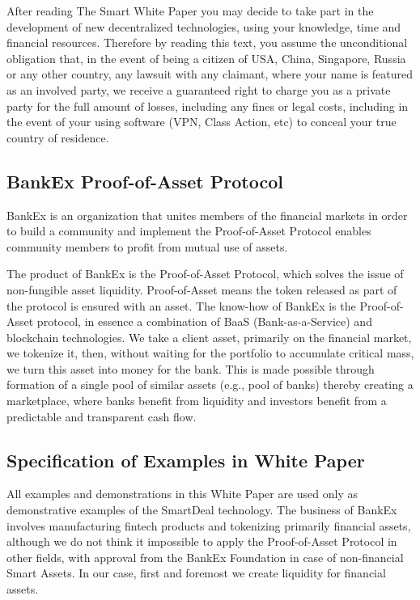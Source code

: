 \documentclass{article}
\begin{document}
\begin{multicols}{2}
After reading The Smart White Paper you may decide to take part in the development of new decentralized technologies, using your knowledge, time and financial resources. Therefore by reading this text, you assume the unconditional obligation that, in the event of being a citizen of USA, China, Singapore, Russia or any other country, any lawsuit with any claimant, where your name is featured as an involved party, we receive a guaranteed right to charge you as a private party for the full amount of losses, including any fines or legal costs, including in the event of your using software (VPN, Class Action, etc) to conceal your true country of residence. 

\subsection{BankEx Proof-of-Asset Protocol}

BankEx is an organization that unites members of the financial markets in order to build a community and implement the Proof-of-Asset Protocol enables community members to profit from mutual use of assets. 

The product of BankEx is the Proof-of-Asset Protocol, which solves the issue of non-fungible asset liquidity. Proof-of-Asset means the token released as part of the protocol is ensured with an asset. 
The know-how of BankEx is the Proof-of-Asset protocol, in essence a combination of BaaS (Bank-as-a-Service) and blockchain technologies. We take a client asset, primarily on the financial market, we tokenize it, then, without waiting for the portfolio to accumulate critical mass, we turn this asset into money for the bank.  This is made possible through formation of a single pool of similar assets (e.g., pool of banks) thereby creating a marketplace, where banks benefit from liquidity and investors benefit from a predictable and transparent cash flow.

\subsection{Specification of Examples in White Paper}

All examples and demonstrations in this White Paper are used only as demonstrative examples of the SmartDeal technology. The business of BankEx involves manufacturing fintech products and tokenizing primarily financial assets, although we do not think it impossible to apply the Proof-of-Asset Protocol in other fields, with approval from the BankEx Foundation in case of non-financial Smart Assets. In our case, first and foremost we create liquidity for financial assets.


\end{multicols}
\end{document}
